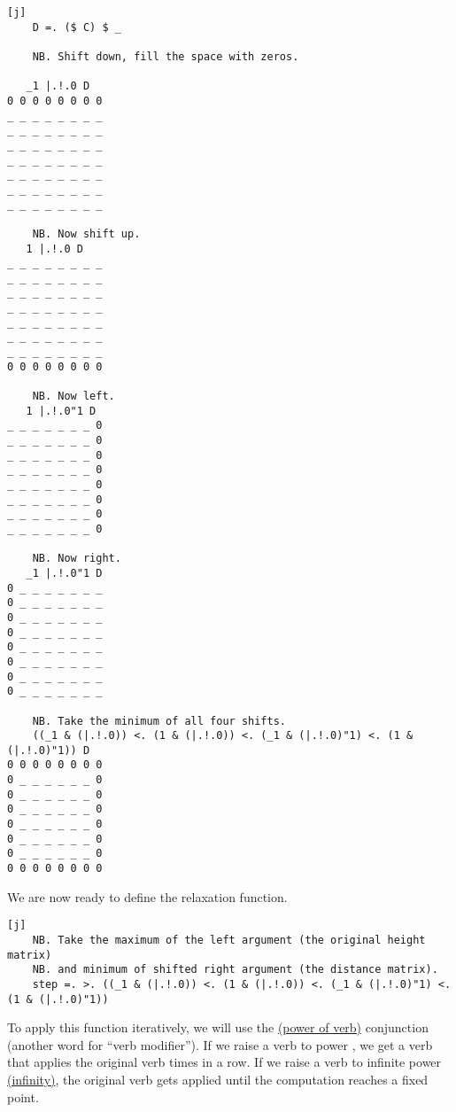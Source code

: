 \documentclass{article}
\begin{document}
\begin{verbatim}[j]
    D =. ($ C) $ _

    NB. Shift down, fill the space with zeros.

   _1 |.!.0 D
0 0 0 0 0 0 0 0
_ _ _ _ _ _ _ _
_ _ _ _ _ _ _ _
_ _ _ _ _ _ _ _
_ _ _ _ _ _ _ _
_ _ _ _ _ _ _ _
_ _ _ _ _ _ _ _
_ _ _ _ _ _ _ _

    NB. Now shift up.
   1 |.!.0 D
_ _ _ _ _ _ _ _
_ _ _ _ _ _ _ _
_ _ _ _ _ _ _ _
_ _ _ _ _ _ _ _
_ _ _ _ _ _ _ _
_ _ _ _ _ _ _ _
_ _ _ _ _ _ _ _
0 0 0 0 0 0 0 0

    NB. Now left.
   1 |.!.0"1 D
_ _ _ _ _ _ _ 0
_ _ _ _ _ _ _ 0
_ _ _ _ _ _ _ 0
_ _ _ _ _ _ _ 0
_ _ _ _ _ _ _ 0
_ _ _ _ _ _ _ 0
_ _ _ _ _ _ _ 0
_ _ _ _ _ _ _ 0

    NB. Now right.
   _1 |.!.0"1 D
0 _ _ _ _ _ _ _
0 _ _ _ _ _ _ _
0 _ _ _ _ _ _ _
0 _ _ _ _ _ _ _
0 _ _ _ _ _ _ _
0 _ _ _ _ _ _ _
0 _ _ _ _ _ _ _
0 _ _ _ _ _ _ _

    NB. Take the minimum of all four shifts.
    ((_1 & (|.!.0)) <. (1 & (|.!.0)) <. (_1 & (|.!.0)"1) <. (1 & (|.!.0)"1)) D
0 0 0 0 0 0 0 0
0 _ _ _ _ _ _ 0
0 _ _ _ _ _ _ 0
0 _ _ _ _ _ _ 0
0 _ _ _ _ _ _ 0
0 _ _ _ _ _ _ 0
0 _ _ _ _ _ _ 0
0 0 0 0 0 0 0 0
\end{verbatim}

We are now ready to define the relaxation function.

\begin{verbatim}[j]
    NB. Take the maximum of the left argument (the original height matrix)
    NB. and minimum of shifted right argument (the distance matrix).
    step =. >. ((_1 & (|.!.0)) <. (1 & (|.!.0)) <. (_1 & (|.!.0)"1) <. (1 & (|.!.0)"1))
\end{verbatim}

To apply this function iteratively, we will use the \href{https://code.jsoftware.com/wiki/Vocabulary/hatco}{\code{^:} (power of verb)} conjunction (another  word for ``verb modifier'').
If we raise a verb to power , we get a verb that applies the original verb  times in a row.
If we raise a verb to infinite power \href{https://code.jsoftware.com/wiki/Vocabulary/under}{\code{_} (infinity)}, the original verb gets applied until the computation reaches a fixed point.
\end{document}
